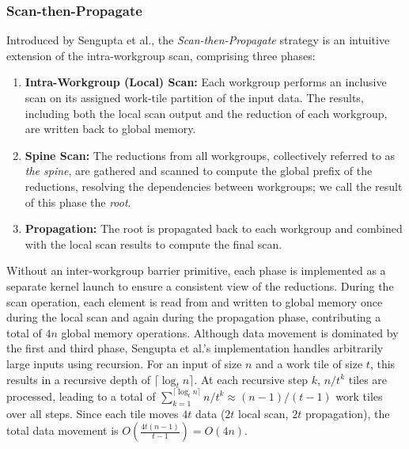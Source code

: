 \documentclass[sigconf]{acmart}
\begin{document}
\subsubsection{Scan-then-Propagate}
Introduced by Sengupta et al.\cite{10.5555/1280094.1280110}, the \emph{Scan-then-Propagate} \cite{GPUGems3, Sengupta2008} strategy is an intuitive extension of the intra-workgroup scan, comprising three phases: 
\begin{enumerate} 
  \item \textbf{Intra-Workgroup (Local) Scan:} Each workgroup performs an inclusive scan on its assigned work-tile partition of the input data. The results, including both the local scan output and the reduction of each workgroup, are written back to global memory.
  \item \textbf{Spine Scan:} The reductions from all workgroups, collectively referred to as \emph{the spine}, are gathered and scanned to compute the global prefix of the reductions, resolving the dependencies between workgroups; we call the result of this phase the \emph{root}. 
  \item \textbf{Propagation:} The root is propagated back to each workgroup and combined with the local scan results to compute the final scan. 
\end{enumerate}
Without an inter-workgroup barrier primitive, each phase is implemented as a separate kernel launch to ensure a consistent view of the reductions. During the scan operation, each element is read from and written to global memory once during the local scan and again during the propagation phase, contributing a total of $4n$ global memory operations. Although data movement is dominated by the first and third phase, Sengupta et al.'s implementation handles arbitrarily large inputs using recursion. For an input of size $n$ and a work tile of size $t$, this results in a recursive depth of $\lceil \log_t n \rceil$. At each recursive step $k$, $n/t^k$ tiles are processed, leading to a total of $\sum_{k=1}^{\lceil \log_t n \rceil} n/t^k \approx (n - 1)/(t - 1)$ work tiles over all steps. Since each tile moves $4t$ data ($2t$ local scan, $2t$ propagation), the total data movement is $O\left(\frac{4t(n - 1)}{t - 1}\right) = O(4n)$.
\end{document}

